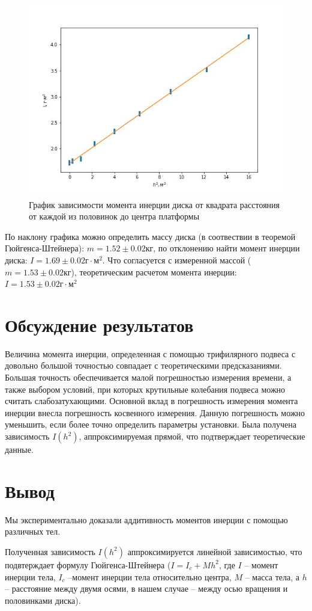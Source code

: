 \documentclass[a4, 12pt]{article}
\begin{document}
\begin{figure}[h!]
\begin{center}
\includegraphics[width=\textwidth]{graph123.jpg}
\end{center}
\caption{График зависимости момента инерции диска от квадрата расстояния от каждой из половинок до центра платформы} \label{график}
\end{figure}


По наклону графика можно определить массу диска (в соотвествии в теоремой Гюйгенса-Штейнера): $m = 1.52 \pm 0.02 $кг, по отклонению найти момент инерции диска: $I = 1.69 \pm 0.02 \text{г}\cdot \text{м}^2$. Что согласуется с измеренной массой ($m = 1.53 \pm 0.02 $кг), теоретическим расчетом момента инерции: $I = 1.53 \pm 0.02 \text{г}\cdot \text{м}^2$

\section{Обсуждение результатов}
Величина момента инерции, определенная с помощью трифилярного подвеса с довольно большой точностью совпадает с теоретическими предсказаниями. Большая точность обеспечивается малой погрешностью измерения времени, а также выбором условий, при которых крутильные колебания подвеса можно считать слабозатухающими.
Основной вклад в погрешность измерения момента инерции внесла погрешность косвенного измерения. Данную погрешность можно уменьшить, если более точно определить параметры установки.
Была получена зависимость $ I(h^{2}) $, аппроксимируемая прямой, что подтверждает теоретические данные.
\section{Вывод}
		
		Мы экспериментально доказали аддитивность моментов инерции с помощью различных тел.

        
		
		Полученная зависимость $I(h^2)$ аппроксимируется линейной зависимостью, что подвтерждает формулу Гюйгенса-Штейнера ($I = I_c + Mh^2$, где $I$ -- момент инерции тела, $I_c$ --момент инерции тела относительно центра, $M$ -- масса тела, а $h$ -- расстояние между двумя осями, в нашем случае -- между осью вращения и половинками диска).
		
\end{document}
